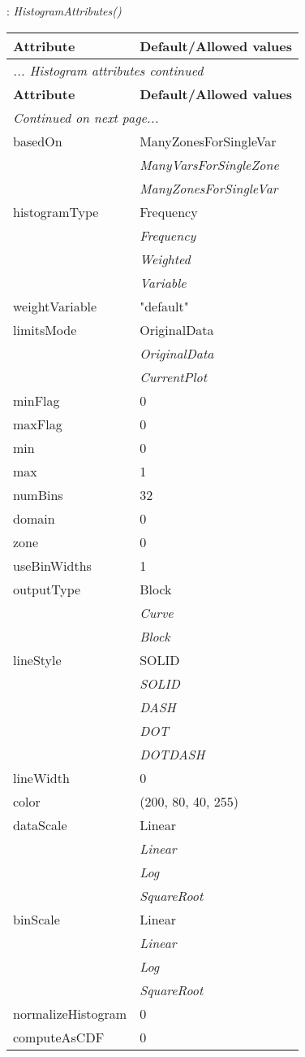 \documentclass[10pt,a4paper]{report}
\begin{document}
\newpage

{}
: {\it HistogramAttributes() }\\[-3mm]

\begin{longtable}{ll}
{\bf Attribute} & {\bf Default/Allowed values} \\
\hline \hline
\endfirsthead
\multicolumn{2}{l}{{\it ... Histogram attributes continued}} \\
{\bf Attribute} & {\bf Default/Allowed values} \\
\hline \hline
\endhead
\hline
\multicolumn{2}{l}{{\it Continued on next page...}} \\
\endfoot
\hline
\endlastfoot

basedOn  &  ManyZonesForSingleVar   \\
 & {\it  ManyVarsForSingleZone} \\
 & {\it  ManyZonesForSingleVar} \\
histogramType  &  Frequency   \\
 & {\it  Frequency} \\
 & {\it  Weighted} \\
 & {\it  Variable} \\
weightVariable  &  "default" \\
limitsMode  &  OriginalData   \\
 & {\it  OriginalData} \\
 & {\it  CurrentPlot} \\
minFlag  &  0 \\
maxFlag  &  0 \\
min  &  0 \\
max  &  1 \\
numBins  &  32 \\
domain  &  0 \\
zone  &  0 \\
useBinWidths  &  1 \\
outputType  &  Block   \\
 & {\it  Curve} \\
 & {\it  Block} \\
lineStyle  &  SOLID   \\
 & {\it  SOLID} \\
 & {\it  DASH} \\
 & {\it  DOT} \\
 & {\it  DOTDASH} \\
lineWidth  &  0 \\
color  &  (200, 80, 40, 255) \\
dataScale  &  Linear   \\
 & {\it  Linear} \\
 & {\it  Log} \\
 & {\it  SquareRoot} \\
binScale  &  Linear   \\
 & {\it  Linear} \\
 & {\it  Log} \\
 & {\it  SquareRoot} \\
normalizeHistogram  &  0 \\
computeAsCDF  &  0 \\
\end{longtable}
\end{document}
